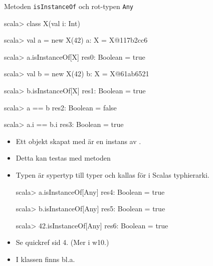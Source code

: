 \begin{Slide}{Metoden \texttt{isInstanceOf} och rot-typen \texttt{Any}}
\SlideFontSmall\vspace{-0.5em}
\begin{multicols}{2}

\begin{REPL}
scala> class X(val i: Int) 

scala> val a = new X(42)
a: X = X@117b2cc6

scala> a.isInstanceOf[X]
res0: Boolean = true

scala> val b = new X(42)
b: X = X@61ab6521

scala> b.isInstanceOf[X]
res1: Boolean = true

scala> a == b
res2: Boolean = false

scala> a.i == b.i
res3: Boolean = true

\end{REPL}

\columnbreak


\begin{itemize}\SlideFontTiny

\item Ett objekt skapat med  är en instans av  . 

\item Detta kan testas med metoden 

\pause

\item Typen  är sypertyp till  typer och kallas för  i Scalas  typhierarki. 

\begin{REPL}
scala> a.isInstanceOf[Any]
res4: Boolean = true

scala> b.isInstanceOf[Any]
res5: Boolean = true

scala> 42.isInstanceOf[Any]
res6: Boolean = true

\end{REPL}
\item Se quickref sid 4. (Mer i w10.)
\item I klassen \href{http://www.scala-lang.org/api/current/#scala.Any}{} finns bl.a. 
\end{itemize}
\end{multicols}
\end{Slide}



